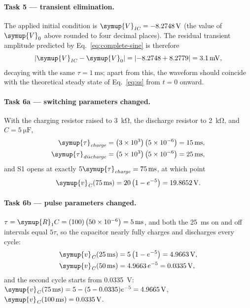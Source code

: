 \documentclass[12pt,a4paper]{article}
\begin{document}
	\paragraph{Task 5 --- transient elimination.}
	The applied initial condition is
	$\symup{V}_{\mathit{IC}} = \SI{-8.2748}{\volt}$ (the value of $\symup{V}_{0}$ above rounded to
	four decimal places).  The residual transient amplitude predicted by
	Eq.~\eqref{eq:complete-sine} is therefore
	\begin{equation}
		\left|\symup{V}_{\mathit{IC}} - \symup{V}_{0}\right| = \left|-8.2748 + 8.2779\right|
		= \SI{3.1}{\milli\volt},
	\end{equation}
	decaying with the same $\tau = \SI{1}{\milli\second}$; apart from
	this, the waveform should coincide with the theoretical steady state
	of Eq.~\eqref{eq:ss} from $t = 0$ onward.
	
	\paragraph{Task 6a --- switching parameters changed.}
	With the charging resistor raised to \SI{3}{\kilo\ohm}, the
	discharge resistor to \SI{2}{\kilo\ohm}, and
	$C = \SI{5}{\micro\farad}$,
	\begin{align}
		\symup{\tau}_{\mathit{charge}} &= \left(3\times 10^{3}\right)\left(5\times 10^{-6}\right)
		= \SI{15}{\milli\second}, \\
		\symup{\tau}_{\mathit{discharge}} &= \left(5\times 10^{3}\right)\left(5\times 10^{-6}\right)
		= \SI{25}{\milli\second},
	\end{align}
	and S1 opens at exactly $5\symup{\tau}_{\mathit{charge}} =
	\SI{75}{\milli\second}$, at which point
	\begin{equation}
		\symup{v}_{\mathit{C}}(\SI{75}{\milli\second}) = 20\left(1 - e^{-5}\right)
		= \SI{19.8652}{\volt}.
	\end{equation}
	
	\paragraph{Task 6b --- pulse parameters changed.}
	$\tau = \symup{R}_{1} C = (100)\left(50\times 10^{-6}\right) =
	\SI{5}{\milli\second}$, and both the \SI{25}{\milli\second} on and
	off intervals equal $5\tau$, so the capacitor nearly fully charges
	and discharges every cycle:
	\begin{align}
		\symup{v}_{\mathit{C}}(\SI{25}{\milli\second}) &= 5\left(1 - e^{-5}\right)
		= \SI{4.9663}{\volt},\\
		\symup{v}_{\mathit{C}}(\SI{50}{\milli\second}) &= 4.9663\, e^{-5} = \SI{0.0335}{\volt},
	\end{align}
	and the second cycle starts from \SI{0.0335}{\volt}:
	$\symup{v}_{\mathit{C}}(\SI{75}{\milli\second}) = 5 - (5 - 0.0335)e^{-5} =
	\SI{4.9665}{\volt}$, $\symup{v}_{\mathit{C}}(\SI{100}{\milli\second}) = \SI{0.0335}{\volt}$.
	
\end{document}
